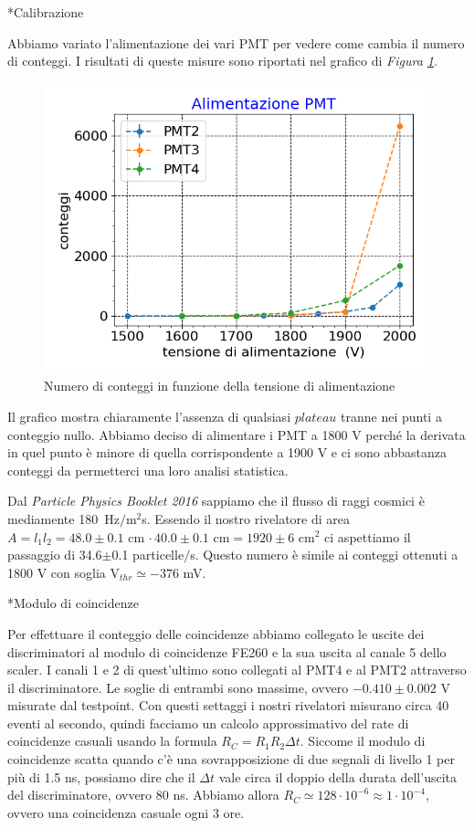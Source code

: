 \documentclass[12pt, a4paper]{article}
\author{ Marasciulli Andrea \qquad  Lorenzetti Giacomo \qquad Browne Roberto}
\date{\today}
\begin{document}
\begin{section}*{Calibrazione}

Abbiamo variato l'alimentazione dei vari PMT per vedere come cambia il numero di conteggi. I risultati di queste misure sono  riportati nel grafico di \emph{Figura \ref{tensio}}. 

\begin{figure}[h]
\centering
\includegraphics[width=8 cm]{tensio_pmt}
\caption{Numero di conteggi in funzione della tensione di alimentazione}
\label{tensio}
\end{figure}

Il grafico mostra chiaramente l'assenza di qualsiasi $plateau$ tranne nei punti a conteggio nullo. Abbiamo deciso di alimentare i PMT a 1800\! V perché la derivata in quel punto è minore di quella corrispondente a 1900\! V e ci sono abbastanza conteggi da permetterci una loro analisi statistica.

Dal \emph{Particle Physics Booklet 2016} sappiamo che il flusso di raggi cosmici è mediamente 180~Hz$/$\!m$^2$s. Essendo il nostro rivelatore di area $A=l_1l_2=48.0\pm0.1$\! cm $\cdot \, 40.0\pm0.1$\! cm$=1920\pm6$\! cm$^2$ ci aspettiamo il passaggio di 34.6$\pm$0.1 particelle$/$s. Questo numero è simile ai conteggi ottenuti a 1800\! V con soglia V$_{thr}\simeq-376$\! mV. 

\end{section}


\begin{section}*{Modulo di coincidenze}

Per effettuare il conteggio delle coincidenze abbiamo collegato le uscite dei discriminatori al modulo di coincidenze FE260 e la sua uscita al canale 5 dello scaler. I canali 1 e 2 di quest'ultimo sono collegati al PMT4 e al PMT2 attraverso il discriminatore. Le soglie di entrambi sono massime, ovvero $-0.410\pm0.002$\! V misurate dal testpoint. Con questi settaggi i nostri rivelatori misurano circa 40 eventi al secondo, quindi facciamo un calcolo approssimativo del rate di coincidenze casuali usando la formula $R_C=R_1R_2\Delta t$. Siccome il modulo di coincidenze scatta quando c'è una sovrapposizione  di due segnali di livello 1 per più di 1.5\! ns, possiamo dire che il $\Delta t$ vale circa il doppio della durata dell'uscita del discriminatore, ovvero 80\! ns. Abbiamo allora $R_C\simeq 128\cdot10^{-6}\approx1\cdot10^{-4}$, ovvero una coincidenza casuale ogni 3 ore.

\end{section}
\end{document}
